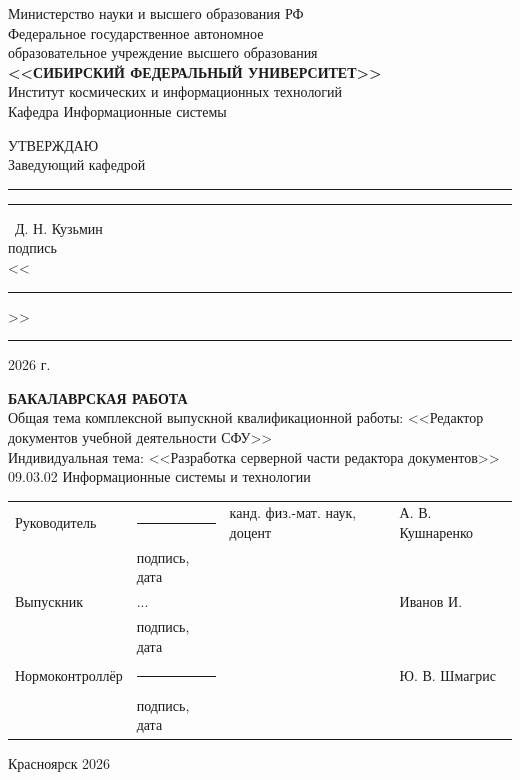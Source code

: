 \begin{titlepage}
	\begin{center}
		Министерство науки и высшего образования  РФ\\
		{\small Федеральное государственное автономное}\\
		{\small образовательное учреждение высшего образования}\\
		\textbf{\small<<СИБИРСКИЙ ФЕДЕРАЛЬНЫЙ УНИВЕРСИТЕТ>>}\\
		\vfill
		Институт космических и информационных технологий\\
		Кафедра Информационные системы\\
    \end{center}		
	\begin{minipage}[h]{0.45\linewidth}
	\hfil
	\end{minipage}
	\hspace{5mm}
	\begin{minipage}[h]{0.45\linewidth}
			УТВЕРЖДАЮ\\
			Заведующий кафедрой\\[5mm]
			\rule{2cm}{.1pt} \rule{0.8cm}{0pt} ~Д. Н. Кузьмин\\
			{\small подпись}\\[5mm]
			<<\rule{1cm}{.1pt}>>\rule{2.5cm}{.1pt} 2026 г.
	\end{minipage}
		
	\vspace{7mm}
	
	\vfill
	\begin{center}
		{
			{\fontsize{16pt}{14pt}\selectfont \textbf{БАКАЛАВРСКАЯ РАБОТА}}\\[7mm]
			Общая тема комплексной выпускной квалификационной работы: <<Редактор документов учебной деятельности СФУ>>\\
			Индивидуальная тема: <<Разработка серверной части редактора документов>>\\[3mm]
			09.03.02 Информационные системы и технологии\\[3mm]
		}
	\end{center}
	\vfill
	
\noindent
\begin{tabular}{@{} p{} >{\centering\arraybackslash} p{} p{} p{} @{}}
	Руководитель     & \rule{3.5cm}{.1pt}          & канд. физ.-мат. наук, доцент & А. В. Кушнаренко \\[-1ex]
	& {\scriptsize подпись, дата} &                   &                  \\[2ex]
	Выпускник & ... & & Иванов И. \\[-1ex]
	& {\scriptsize подпись, дата} &                   &                  \\[2ex]
	Нормоконтроллёр  & \rule{3.5cm}{.1pt}          &                   & Ю. В. Шмагрис \\[-1ex]
	& {\scriptsize подпись, дата} &                   &                  \\
\end{tabular}

\vfill
\begin{center}Красноярск 2026\end{center}
\end{titlepage}
\restoregeometry